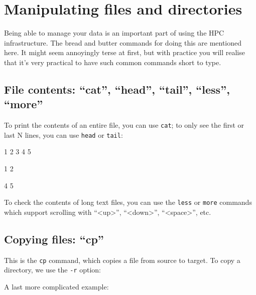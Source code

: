 \chapter{Manipulating files and directories}

Being able to manage your data is an important part of using the HPC
infrastructure.  The bread and butter commands for doing this are mentioned
here.  It might seem annoyingly terse at first, but with practice you will
realise that it's very practical to have such common commands short to type.

\section{File contents: ``cat'', ``head'', ``tail'', ``less'', ``more''}

To print the contents of an entire file, you can use \verb|cat|; to only see the
first or last N lines, you can use \verb|head| or \verb|tail|:

\begin{prompt}
1
2
3
4
5

1
2

4
5
\end{prompt}

To check the contents of long text files, you can use the \verb|less| or \verb|more|
commands which support scrolling with ``<up>'', ``<down>'', ``<space>'', etc.

\section{Copying files: ``cp''}

\begin{prompt}
\end{prompt}

This is the \verb|cp| command, which copies a file from source to target. To copy a directory, we use the \verb|-r| option:

\begin{prompt}
\end{prompt}

A last more complicated example:

\begin{prompt}
\end{prompt}

